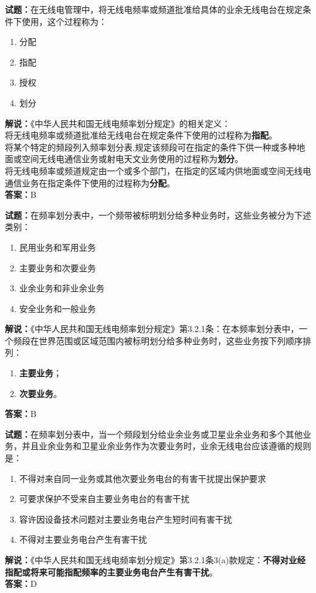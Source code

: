 \documentclass{ctexbook}
\begin{document}
\noindent\textbf{试题：}在无线电管理中，将无线电频率或频道批准给具体的业余无线电台在规定条件下使用，这个过程称为：
\begin{enumerate}[leftmargin=3em]
	\item 分配
	\item 指配
	\item 授权
	\item 划分
\end{enumerate}
\noindent\textbf{解说：}《中华人民共和国无线电频率划分规定》的相关定义：\\将无线电频率或频道批准给无线电台在规定条件下使用的过程称为\textbf{指配}。\\将某个特定的频段列入频率划分表,规定该频段可在指定的条件下供一种或多种地面或空间无线电通信业务或射电天文业务使用的过程称为\textbf{划分}。\\将无线电频率或频道规定由一个或多个部门，在指定的区域内供地面或空间无线电通信业务在指定条件下使用的过程称为\textbf{分配}。\\
\textbf{答案：}B



\bigskip


\noindent\textbf{试题：}在频率划分表中，一个频带被标明划分给多种业务时，这些业务被分为下述类别：
\begin{enumerate}[leftmargin=3em]
	\item 民用业务和军用业务
	\item 主要业务和次要业务
	\item 业余业务和非业余业务
	\item 安全业务和一般业务
\end{enumerate}
\noindent\textbf{解说：}《中华人民共和国无线电频率划分规定》第3.2.1条：在本频率划分表中，一个频段在世界范围或区域范围内被标明划分给多种业务时，这些业务按下列顺序排列：
\begin{enumerate}[leftmargin=3em, label=\alph*)]
	\item \textbf{主要业务}；
	\item \textbf{次要业务}。
\end{enumerate}
\textbf{答案：}B




\bigskip


\noindent\textbf{试题：}在频率划分表中，当一个频段划分给业余业务或卫星业余业务和多个其他业务，并且业余业务和卫星业余业务作为次要业务时，业余无线电台应该遵循的规则是：
\begin{enumerate}[leftmargin=3em]
	\item 不得对来自同一业务或其他次要业务电台的有害干扰提出保护要求
	\item 可要求保护不受来自主要业务电台的有害干扰
	\item 容许因设备技术问题对主要业务电台产生短时间有害干扰
	\item 不得对主要业务电台产生有害干扰
\end{enumerate}
\noindent\textbf{解说：}《中华人民共和国无线电频率划分规定》第3.2.1条3(a)款规定：\textbf{不得对业经指配或将来可能指配频率的主要业务电台产生有害干扰}。\\
\textbf{答案：}D
\end{document}
